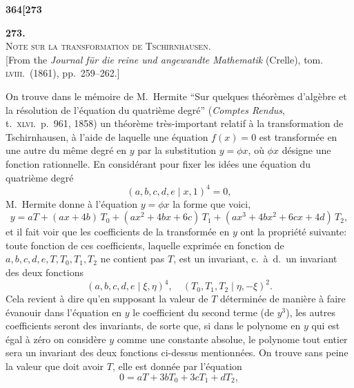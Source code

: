 \documentclass[11pt]{article}
\newcommand{\Cdel}{\mid}
\begin{document}

\newpage
\noindent\textbf{364}\hfill\textbf{[273}

\medskip

\begin{center}
{\Large\bfseries 273.}\\[1em]
{\large\scshape Note sur la transformation de Tschirnhausen.}\\[1em]
{\small [From the \textit{Journal f\"ur die reine und angewandte Mathematik} (Crelle), tom. \textsc{lviii}.\ (1861), pp.~259--262.]}
\end{center}

\medskip

\noindent On trouve dans le m\'emoire de M.~Hermite ``Sur quelques th\'eor\`emes d'alg\`ebre et la r\'esolution de l'\'equation du quatri\`eme degr\'e'' (\textit{Comptes Rendus}, t.~\textsc{xlvi}.\ p.~961, 1858) un th\'eor\`eme tr\`es-important relatif \`a la transformation de Tschirnhausen, \`a l'aide de laquelle une \'equation $f(x) = 0$ est transform\'ee en une autre du m\^eme degr\'e en $y$ par la substitution $y = \phi x$, o\`u $\phi x$ d\'esigne une fonction rationnelle. En consid\'erant pour fixer les id\'ees une \'equation du quatri\`eme degr\'e
\[
(a, b, c, d, e \Cdel x, 1)^4 = 0,
\]
M.~Hermite donne \`a l'\'equation $y = \phi x$ la forme que voici,
\[
y = a T + (a x + 4 b)\, T_0 + (a x^2 + 4 b x + 6 c)\, T_1 + (a x^3 + 4 b x^2 + 6 c x + 4 d)\, T_2,
\]
et il fait voir que les coefficients de la transform\'ee en $y$ ont la propri\'et\'e suivante: toute fonction de ces coefficients, laquelle exprim\'ee en fonction de $a, b, c, d, e, T, T_0, T_1, T_2$ ne contient pas $T$, est un invariant, c.~\`a~d.\ un invariant des deux fonctions
\[
(a, b, c, d, e \Cdel \xi, \eta)^4,\quad (T_0, T_1, T_2 \Cdel \eta, -\xi)^2.
\]
Cela revient \`a dire qu'en supposant la valeur de $T$ d\'etermin\'ee de mani\`ere \`a faire \'evanouir dans l'\'equation en $y$ le coefficient du second terme (de $y^3$), les autres coefficients seront des invariants, de sorte que, si dans le polynome en $y$ qui est \'egal \`a z\'ero on consid\`ere $y$ comme une constante absolue, le polynome tout entier sera un invariant des deux fonctions ci-dessus mentionn\'ees. On trouve sans peine la valeur que doit avoir $T$, elle est donn\'ee par l'\'equation
\[
0 = a T + 3 b T_0 + 3 c T_1 + d T_2,
\]
\end{document}
